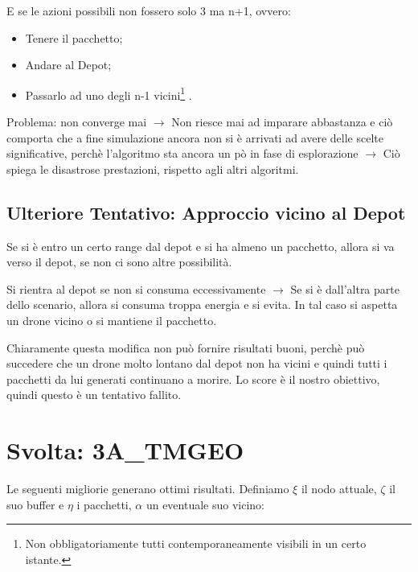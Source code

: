 \documentclass[12pt]{article}
\begin{document}
E se le azioni possibili non fossero solo 3 ma n+1, ovvero:

\begin{itemize}

    \item Tenere il pacchetto;
    \item Andare al Depot;
    \item Passarlo ad uno degli n-1 vicini\footnote{Non obbligatoriamente tutti contemporaneamente visibili in un certo istante.}
    .
\end{itemize}

Problema: non converge mai $\rightarrow$ Non riesce mai ad imparare abbastanza e ciò comporta che a fine simulazione ancora non si è arrivati ad avere delle scelte significative, perchè l'algoritmo sta ancora un pò in fase di esplorazione $\rightarrow$ Ciò spiega le disastrose prestazioni, rispetto agli altri algoritmi.

    
\subsection{Ulteriore Tentativo: Approccio vicino al Depot}

Se si è entro un certo range dal depot e si ha almeno un pacchetto, allora si va verso il depot, se non ci sono altre possibilità. 

Si rientra al depot se non si consuma eccessivamente $\rightarrow$ Se si è dall'altra parte dello scenario, allora si consuma troppa energia e si evita. In tal caso si aspetta un drone vicino o si mantiene il pacchetto.

Chiaramente questa modifica non può fornire risultati buoni, perchè può succedere che un drone molto lontano dal depot non ha vicini e quindi tutti i pacchetti da lui generati continuano a morire. Lo score è il nostro obiettivo, quindi questo è un tentativo fallito.


\section{Svolta: 3A\_TMGEO}

Le seguenti migliorie generano ottimi risultati. Definiamo $\xi$ il nodo attuale, $\zeta$ il suo buffer e $\eta$ i pacchetti, $\alpha$ un eventuale suo vicino:
\end{document}
